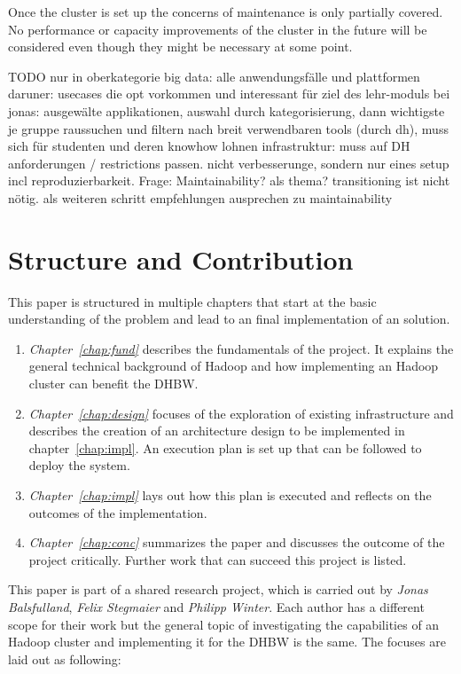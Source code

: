 Once the cluster is set up the concerns of maintenance is only partially covered.
No performance or capacity improvements of the cluster in the future will be considered even though they might be necessary at some point.




TODO nur in oberkategorie big data: alle anwendungsfälle und plattformen
daruner: usecases die opt vorkommen und interessant für ziel des lehr-moduls
bei jonas: ausgewälte applikationen,
auswahl durch kategorisierung, dann wichtigste je gruppe raussuchen und filtern nach breit verwendbaren tools (durch dh), muss sich für studenten und deren knowhow lohnen
infrastruktur: muss auf DH anforderungen / restrictions passen.
nicht verbesserunge, sondern nur eines setup incl reproduzierbarkeit.
Frage: Maintainability? als thema? transitioning ist nicht nötig.
als weiteren schritt empfehlungen ausprechen zu maintainability

\section{Structure and Contribution}
\label{sec:intro:structure}

This paper is structured in multiple chapters that start at the basic understanding of the problem 
and lead to an final implementation of an solution.

\begin{enumerate}
    \item \emph{Chapter~\ref{chap:fund}} describes the fundamentals of the project. 
        It explains the general technical background of Hadoop 
        and how implementing an Hadoop cluster can benefit the \ac{DHBW}. 
    \item \emph{Chapter~\ref{chap:design}} focuses of the exploration of existing
        infrastructure and describes the creation of an architecture design 
        to be implemented in chapter~\ref{chap:impl}. 
        An execution plan is set up that can be followed to deploy the system.
    \item \emph{Chapter~\ref{chap:impl}} lays out how this plan is executed 
        and reflects on the outcomes of the implementation. 
    \item \emph{Chapter~\ref{chap:conc}} summarizes the paper 
        and discusses the outcome of the project critically.
        Further work that can succeed this project is listed.
\end{enumerate}

This paper is part of a shared research project,
which is carried out by \emph{Jonas Balsfulland}, \emph{Felix Stegmaier} and \emph{Philipp Winter}.
Each author has a different scope for their work 
but the general topic of investigating the capabilities of an Hadoop cluster 
and implementing it for the \ac{DHBW} is the same.
The focuses are laid out as following:

